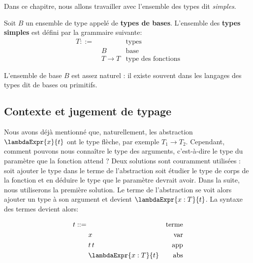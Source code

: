 Dans ce chapitre, nous allons travailler avec l'ensemble des types dit
\textit{simples}.

\begin{definition}
  Soit $B$ un ensemble de type appelé de \textbf{types de bases}.
  L'ensemble des \textbf{types simples} est défini par la grammaire suivante:
  \begin{align*}
    T ::= & \, & \text{types} \\
          & \; B & \text{base} \\
          & \; T \rightarrow T & \text{type des fonctions}
  \end{align*}
\end{definition}

L'ensemble de base $B$ est assez naturel : il existe souvent dans les langages
des types dit de bases ou primitifs.



\subsection*{Contexte et jugement de typage}

Nous avons déjà mentionné que, naturellement, les abstraction $\lambdaExpr{x}{t}$ ont le type
flèche, par exemple $T_{1} \rightarrow T_{2}$. Cependant, comment pouvons nous
connaître le type des arguments, c'est-à-dire le type du paramètre que la
fonction attend ? Deux solutions sont couramment utilisées : soit ajouter le type
dans le terme de l'abstraction soit étudier le type de corps de la fonction et
en déduire le type que le paramètre devrait avoir.
Dans la suite, nous utiliserons la première solution. Le terme de l'abstraction
se voit alors ajouter un type à son argument et devient $\lambdaExpr{x : T}{t}$.
La syntaxe des termes devient alors:

\begin{align*}
  t ::= & \, & \text{terme} \\
        & \; x & \text{var} \\
        & \; t \, t & \text{app} \\
        & \; \lambdaExpr{x : T}{t} & \text{abs}
\end{align*}


